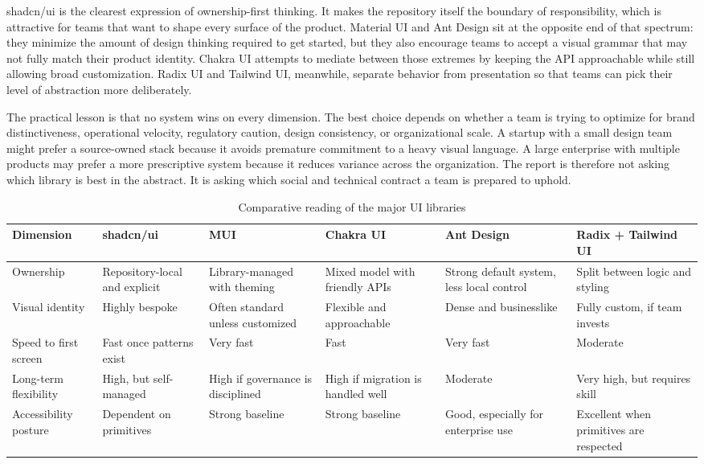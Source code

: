 \documentclass[11pt,twoside,a4paper]{article}
\begin{document}
shadcn/ui is the clearest expression of ownership-first thinking. It makes the repository itself the boundary of responsibility, which is attractive for teams that want to shape every surface of the product. Material UI and Ant Design sit at the opposite end of that spectrum: they minimize the amount of design thinking required to get started, but they also encourage teams to accept a visual grammar that may not fully match their product identity. Chakra UI attempts to mediate between those extremes by keeping the API approachable while still allowing broad customization. Radix UI and Tailwind UI, meanwhile, separate behavior from presentation so that teams can pick their level of abstraction more deliberately.

The practical lesson is that no system wins on every dimension. The best choice depends on whether a team is trying to optimize for brand distinctiveness, operational velocity, regulatory caution, design consistency, or organizational scale. A startup with a small design team might prefer a source-owned stack because it avoids premature commitment to a heavy visual language. A large enterprise with multiple products may prefer a more prescriptive system because it reduces variance across the organization. The report is therefore not asking which library is best in the abstract. It is asking which social and technical contract a team is prepared to uphold.

\begin{table}[htbp]
  \centering
  \caption{Comparative reading of the major UI libraries}
  \begin{tabularx}{\textwidth}{@{}p{}YYYYY@{}}
    \toprule
    \textbf{Dimension} & \textbf{shadcn/ui} & \textbf{MUI} & \textbf{Chakra UI} & \textbf{Ant Design} & \textbf{Radix + Tailwind UI} \\
    \midrule
    Ownership & Repository-local and explicit & Library-managed with theming & Mixed model with friendly APIs & Strong default system, less local control & Split between logic and styling \\
    Visual identity & Highly bespoke & Often standard unless customized & Flexible and approachable & Dense and businesslike & Fully custom, if team invests \\
    Speed to first screen & Fast once patterns exist & Very fast & Fast & Very fast & Moderate \\
    Long-term flexibility & High, but self-managed & High if governance is disciplined & High if migration is handled well & Moderate & Very high, but requires skill \\
    Accessibility posture & Dependent on primitives & Strong baseline & Strong baseline & Good, especially for enterprise use & Excellent when primitives are respected \\
    \bottomrule
  \end{tabularx}
\end{table}
\end{document}
